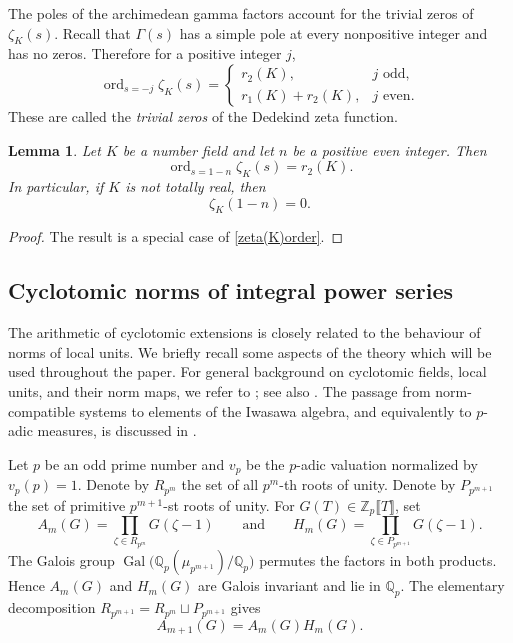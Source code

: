 \documentclass[11pt,table]{amsart}
\newtheorem{lemma}[theorem]{Lemma}
\newcommand{\Q}{\mathbb{Q}}
\newcommand{\op}[1]{\operatorname{#1}}
\numberwithin{equation}{section}
\begin{document}
\par The poles of the archimedean gamma factors account for the
trivial zeros of \(\zeta_K(s)\). Recall that \(\Gamma(s)\) has a
simple pole at every nonpositive integer and has no zeros. Therefore for a positive integer $j$,
\begin{equation}\label{zeta(K)order}\operatorname{ord}_{s=-j}\zeta_K(s)
        =
        \begin{cases}
        r_2(K), & j \text{ odd},\\[4pt]
        r_1(K)+r_2(K), & j \text{ even}.
        \end{cases}
\end{equation}
These are called the \emph{trivial zeros} of the Dedekind zeta
function.

\begin{lemma}
\label{lem:vanishing-nontotally-real}
Let \(K\) be a number field and let $n$ be a positive even integer. Then
\[
        \operatorname{ord}_{s=1-n}\zeta_K(s)=r_2(K).
\]
In particular, if $K$ is not totally real, then 
\[\zeta_K(1-n)=0.\]
\end{lemma}

\begin{proof} The result is a special case of \eqref{zeta(K)order}.
\end{proof}

\subsection{Cyclotomic norms of integral power series}\label{sec:norm}

\par The arithmetic of cyclotomic extensions is closely related to the behaviour of
norms of local units. We briefly recall some aspects of the theory which will be used throughout the paper. For general background on cyclotomic
fields, local units, and their norm maps, we refer to
\cite[Chapters~1--2]{CoatesSujatha}; see also
\cite[Chapter~13]{Washington1997}. The passage from norm-compatible systems
to elements of the Iwasawa algebra, and equivalently to \(p\)-adic measures,
is discussed in \cite[Chapter~3]{CoatesSujatha}.
\par Let $p$ be an odd prime number and $v_p$ be the $p$-adic valuation normalized by $v_p(p)=1$. Denote by $R_{p^m}$ the set of all $p^m$-th roots of unity. Denote by
$P_{p^{m+1}}$ the set of primitive $p^{m+1}$-st roots of unity. For
$G(T)\in\mathbb Z_p\llbracket T\rrbracket$, set
\begin{equation}\label{A_m and H_m}
 A_m(G)=\prod_{\zeta\in R_{p^m}}G(\zeta-1)
 \qquad\text{and}\qquad
 H_m(G)=\prod_{\zeta\in P_{p^{m+1}}}G(\zeta-1).
\end{equation}
The Galois group $\op{Gal}\bigl(\Q_p(\mu_{p^{m+1}})/\Q_p\bigr)$
permutes the factors in both products. Hence \(A_m(G)\) and \(H_m(G)\) are Galois invariant and lie in \(\Q_p\). The elementary decomposition
$R_{p^{m+1}}=R_{p^m}\sqcup P_{p^{m+1}}$ gives
\begin{equation}\label{eq:AmHm}
 A_{m+1}(G)=A_m(G)H_m(G).
\end{equation}
\end{document}
